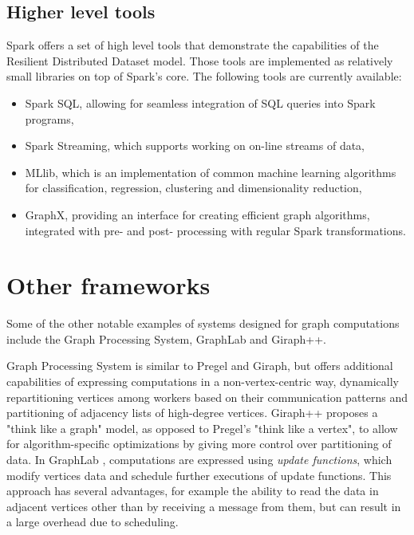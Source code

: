 \subsection{Higher level tools}
Spark offers a set of high level tools that demonstrate the capabilities of the Resilient Distributed Dataset model. Those tools are implemented as relatively small libraries on top of Spark's core. The following tools are currently available:
\begin{itemize}
\item Spark SQL, allowing for seamless integration of SQL queries into Spark programs,
\item Spark Streaming, which supports working on on-line streams of data,
\item MLlib, which is an implementation of common machine learning algorithms for classification, regression, clustering and dimensionality reduction,
\item GraphX, providing an interface for creating efficient graph algorithms, integrated with pre- and post- processing with regular Spark transformations.
\end{itemize}

\section{Other frameworks}
Some of the other notable examples of systems designed for graph computations include the Graph Processing System, GraphLab and Giraph++.

Graph Processing System \cite{gps} is similar to Pregel and Giraph, but offers additional capabilities of expressing computations in a non-vertex-centric way, dynamically repartitioning vertices among workers based on their communication patterns and partitioning of adjacency lists of high-degree vertices. Giraph++ \cite{giraphpp} proposes a "think like a graph" model, as opposed to Pregel's "think like a vertex", to allow for algorithm-specific optimizations by giving more control over partitioning of data. In GraphLab \cite{graphlabwww, graphlab, graphlab2}, computations are expressed using \emph{update functions}, which modify vertices data and schedule further executions of update functions. This approach has several advantages, for example the ability to read the data in adjacent vertices other than by receiving a message from them, but can result in a large overhead due to scheduling.


